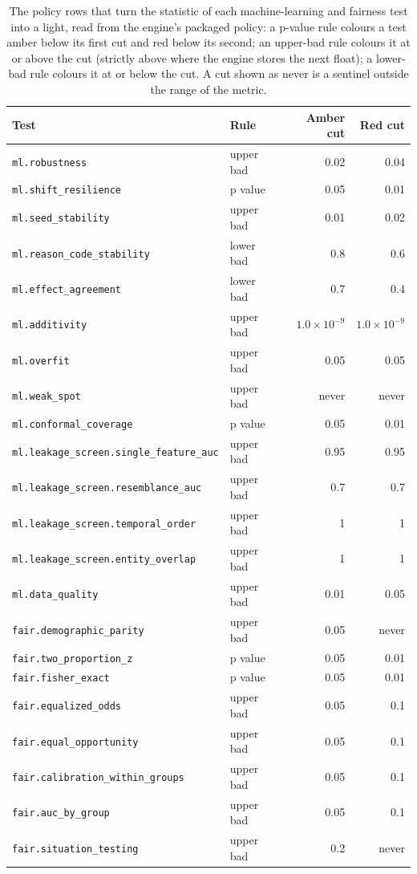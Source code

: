 \begin{table}[htbp]
\centering
\setlength{\tabcolsep}{3pt}
\footnotesize
\caption{The policy rows that turn the statistic of each machine-learning and fairness test into a light, read from the engine's packaged policy: a p-value rule colours a test amber below its first cut and red below its second; an upper-bad rule colours it at or above the cut (strictly above where the engine stores the next float); a lower-bad rule colours it at or below the cut. A cut shown as never is a sentinel outside the range of the metric.}
\label{tab:vt-policy}
\begin{tabular}{llrr}
\toprule
Test & Rule & Amber cut & Red cut \\
\midrule
\nolinkurl{ml.robustness} & upper bad & 0.02 & 0.04 \\
\nolinkurl{ml.shift_resilience} & p value & 0.05 & 0.01 \\
\nolinkurl{ml.seed_stability} & upper bad & 0.01 & 0.02 \\
\nolinkurl{ml.reason_code_stability} & lower bad & 0.8 & 0.6 \\
\nolinkurl{ml.effect_agreement} & lower bad & 0.7 & 0.4 \\
\nolinkurl{ml.additivity} & upper bad & $1.0\times10^{-9}$ & $1.0\times10^{-9}$ \\
\nolinkurl{ml.overfit} & upper bad & 0.05 & 0.05 \\
\nolinkurl{ml.weak_spot} & upper bad & never & never \\
\nolinkurl{ml.conformal_coverage} & p value & 0.05 & 0.01 \\
\nolinkurl{ml.leakage_screen.single_feature_auc} & upper bad & 0.95 & 0.95 \\
\nolinkurl{ml.leakage_screen.resemblance_auc} & upper bad & 0.7 & 0.7 \\
\nolinkurl{ml.leakage_screen.temporal_order} & upper bad & 1 & 1 \\
\nolinkurl{ml.leakage_screen.entity_overlap} & upper bad & 1 & 1 \\
\nolinkurl{ml.data_quality} & upper bad & 0.01 & 0.05 \\
\nolinkurl{fair.demographic_parity} & upper bad & 0.05 & never \\
\nolinkurl{fair.two_proportion_z} & p value & 0.05 & 0.01 \\
\nolinkurl{fair.fisher_exact} & p value & 0.05 & 0.01 \\
\nolinkurl{fair.equalized_odds} & upper bad & 0.05 & 0.1 \\
\nolinkurl{fair.equal_opportunity} & upper bad & 0.05 & 0.1 \\
\nolinkurl{fair.calibration_within_groups} & upper bad & 0.05 & 0.1 \\
\nolinkurl{fair.auc_by_group} & upper bad & 0.05 & 0.1 \\
\nolinkurl{fair.situation_testing} & upper bad & 0.2 & never \\
\bottomrule
\end{tabular}
\end{table}
